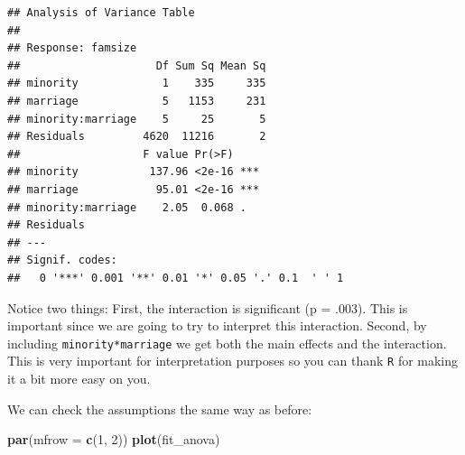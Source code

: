 \documentclass[]{tufte-book}
\newenvironment{Shaded}{}{}
\newcommand{\KeywordTok}[1]{\textcolor[rgb]{0.00,0.44,0.13}{\textbf{#1}}}
\newcommand{\DataTypeTok}[1]{\textcolor[rgb]{0.56,0.13,0.00}{#1}}
\newcommand{\DecValTok}[1]{\textcolor[rgb]{0.25,0.63,0.44}{#1}}
\newcommand{\StringTok}[1]{\textcolor[rgb]{0.25,0.44,0.63}{#1}}
\newcommand{\OperatorTok}[1]{\textcolor[rgb]{0.40,0.40,0.40}{#1}}
\newcommand{\NormalTok}[1]{#1}
\theoremstyle{definition}
\theoremstyle{definition}
\theoremstyle{remark}
\begin{document}
\begin{Shaded}
\end{Shaded}

\begin{verbatim}
## Analysis of Variance Table
## 
## Response: famsize
##                     Df Sum Sq Mean Sq
## minority             1    335     335
## marriage             5   1153     231
## minority:marriage    5     25       5
## Residuals         4620  11216       2
##                   F value Pr(>F)    
## minority           137.96 <2e-16 ***
## marriage            95.01 <2e-16 ***
## minority:marriage    2.05  0.068 .  
## Residuals                           
## ---
## Signif. codes:  
##   0 '***' 0.001 '**' 0.01 '*' 0.05 '.' 0.1  ' ' 1
\end{verbatim}

Notice two things: First, the interaction is significant (p = .003).
This is important since we are going to try to interpret this
interaction. Second, by including \texttt{minority*marriage} we get both
the main effects and the interaction. This is very important for
interpretation purposes so you can thank \texttt{R} for making it a bit
more easy on you.

We can check the assumptions the same way as before:

\begin{Shaded}
\begin{Highlighting}[]
\KeywordTok{par}\NormalTok{(}\DataTypeTok{mfrow =} \KeywordTok{c}\NormalTok{(}\DecValTok{1}\NormalTok{, }\DecValTok{2}\NormalTok{))}
\KeywordTok{plot}\NormalTok{(fit_anova)}
\end{Highlighting}
\end{Shaded}
\end{document}
